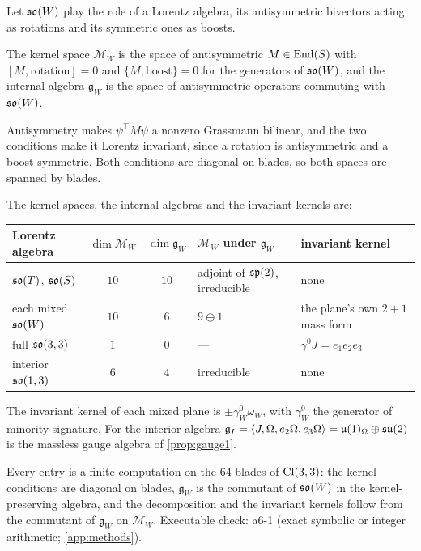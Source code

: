 Let $\mathfrak{so}(W)$ play the role of a Lorentz algebra, its antisymmetric bivectors acting as rotations and its symmetric ones as boosts.

\begin{definition}
\label{def:subkernel}
The kernel space $\mathcal M_W$ is the space of antisymmetric $M\in\operatorname{End}(S)$ with $[M,\text{rotation}]=0$ and $\{M,\text{boost}\}=0$ for the generators of
$\mathfrak{so}(W)$, and the internal algebra $\mathfrak g_W$ is the space of antisymmetric operators commuting with $\mathfrak{so}(W)$.
\end{definition}

Antisymmetry makes $\psi^{\!\top}M\psi$ a nonzero Grassmann bilinear, and the two conditions make it Lorentz invariant, since a rotation is
antisymmetric and a boost symmetric. Both conditions are diagonal on blades, so both spaces are spanned by blades.

\begin{theorem}
\label{thm:subkernels}
The kernel spaces, the internal algebras and the invariant kernels are:
\begin{center}
\small\upshape\setlength{\tabcolsep}{4pt}
\begin{tabular}{@{}lccll@{}}
\toprule
Lorentz algebra & $\dim\mathcal M_W$ & $\dim\mathfrak g_W$ & $\mathcal M_W$ under $\mathfrak g_W$ & invariant kernel\\
\midrule
$\mathfrak{so}(T)$, $\mathfrak{so}(S)$ & $10$ & $10$ & adjoint of $\mathfrak{sp}(2)$, irreducible & none\\
each mixed $\mathfrak{so}(W)$ & $10$ & $6$ & $9\oplus1$ & the plane's own $2{+}1$ mass form\\
full $\mathfrak{so}(3,3)$ & $1$ & $0$ & --- & $\gamma^0J=e_1e_2e_3$\\
interior $\mathfrak{so}(1,3)$ & $6$ & $4$ & irreducible & none\\
\bottomrule
\end{tabular}
\end{center}
The invariant kernel of each mixed plane is $\pm\gamma^0_W\omega_W$, with $\gamma^0_W$ the generator of minority signature. For the interior
algebra $\mathfrak g_I=\langle J,\Omega,e_2\Omega,e_3\Omega\rangle=\mathfrak{u}(1)_\Omega\oplus\mathfrak{su}(2)$ is the massless gauge algebra of \cref{prop:gauge1}.
\end{theorem}

\noindent Every entry is a finite computation on the $64$ blades of $\mathrm{Cl}(3,3)$: the kernel conditions are diagonal on blades, $\mathfrak g_W$ is the
commutant of $\mathfrak{so}(W)$ in the kernel-preserving algebra, and the decomposition and the invariant kernels follow from the commutant of $\mathfrak g_W$ on
$\mathcal M_W$. Executable check: a6-1 (exact symbolic or integer arithmetic; \cref{app:methods}).

